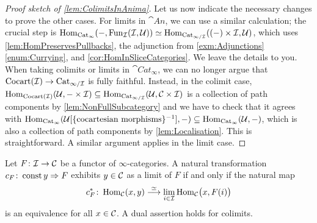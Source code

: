 \begin{proof}[Proof sketch of \cref{lem:ColimitsInAnima}]
	Let us now indicate the necessary changes to prove the other cases. For limits in $\cat{An}$, we can use a similar calculation; the crucial step is $\operatorname{Hom}_{\mathrm{Cat}_\infty}(-,\operatorname{Fun}_{\mathcal{I}}(\mathcal{I},\mathcal{U}))\simeq \operatorname{Hom}_{\mathrm{Cat}_{\infty/\mathcal{I}}}((-)\times\mathcal{I},\mathcal{U})$, which uses \cref{lem:HomPreservesPullbacks}, the adjunction from \cref{exm:Adjunctions}\cref{enum:Currying}, and \cref{cor:HomInSliceCategories}. We leave the details to you. When taking colimits or limits in $\cat{Cat}_\infty$, we can no longer argue that $\mathrm{Cocart}(\mathcal{I})\rightarrow \mathrm{Cat}_{\infty/\mathcal{I}}$ is fully faithful. Instead, in the colimit case, $\operatorname{Hom}_{\mathrm{Cocart}(\mathcal{I})}(\mathcal{U},-\times\mathcal{I})\subseteq \operatorname{Hom}_{\mathrm{Cat}_{\infty/\mathcal{I}}}(\mathcal{U},\mathcal{C}\times\mathcal{I})$ is a collection of path components by \cref{lem:NonFullSubcategory} and we have to check that it agrees with $\operatorname{Hom}_{\mathrm{Cat}_\infty}(\mathcal{U}[\{\text{cocartesian morphisms}\}^{-1}],-)\subseteq \operatorname{Hom}_{\mathrm{Cat}_\infty}(\mathcal{U},-)$, which is also a collection of path components by \cref{lem:Localisation}. This is straightforward. A similar argument applies in the limit case.
\end{proof}
\begin{cor}\label{cor:HomPreservesColimits}
	Let $F\colon \mathcal{I}\rightarrow\mathcal{C}$ be a functor of $\infty$-categories. A natural transformation $c_F\colon \operatorname{const} y\Rightarrow F$ exhibits $y\in \mathcal{C}$ as a limit of $F$ if and only if the natural map
	\begin{equation*}
		c_F^*\colon \operatorname{Hom}_{\mathcal{C}}(x,y)\overset{\simeq}{\longrightarrow}\operatorname*{lim}_{i\in\mathcal{I}}\operatorname{Hom}_{\mathcal{C}}\bigl(x,F(i)\bigr)
	\end{equation*}
	is an equivalence for all $x\in \mathcal{C}$. A dual assertion holds for colimits.
\end{cor}
